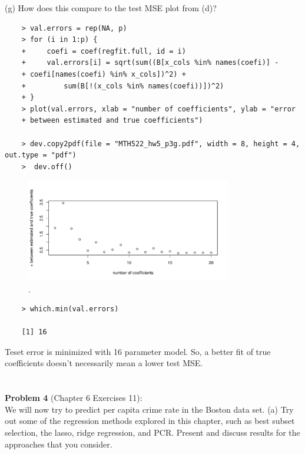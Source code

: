 \documentclass{article}
\begin{document}
(g) How does this compare to the test MSE plot from (d)?

\begin{program}
	\begin{verbatim}
	> val.errors = rep(NA, p)
	> for (i in 1:p) {
	+     coefi = coef(regfit.full, id = i)
	+     val.errors[i] = sqrt(sum((B[x_cols %in% names(coefi)] -
	+ coefi[names(coefi) %in% x_cols])^2) +
	+         sum(B[!(x_cols %in% names(coefi))])^2)
	+ }
	> plot(val.errors, xlab = "number of coefficients", ylab = "error
	+ between estimated and true coefficients")
	
	> dev.copy2pdf(file = "MTH522_hw5_p3g.pdf", width = 8, height = 4, out.type = "pdf")
	>  dev.off()	
   	\end{verbatim}
\end{program}

\begin{figure}[htb]
	\begin{center}
		\includegraphics[width=0.8\textwidth]{MTH522_hw5_p3g.pdf}
	\end{center}
	\caption{.}
	\label{fig:MTH522_hw5_p3g}
\end{figure}


\newpage





\begin{program}
	\begin{verbatim}
	> which.min(val.errors)

	[1] 16
	\end{verbatim}
\end{program}

Teset error is minimized with 16 parameter model. So, a better fit of true coefficients doesn't necessarily mean a lower test MSE.\\
\\
\\
{\bf Problem 4} (Chapter 6 Exercises 11):\\
We will now try to predict per capita crime rate in the Boston data set.
(a) Try out some of the regression methods explored in this chapter, such as best subset selection, the lasso, ridge regression, and PCR. Present and discuss results for the approaches that you consider.
\end{document}
